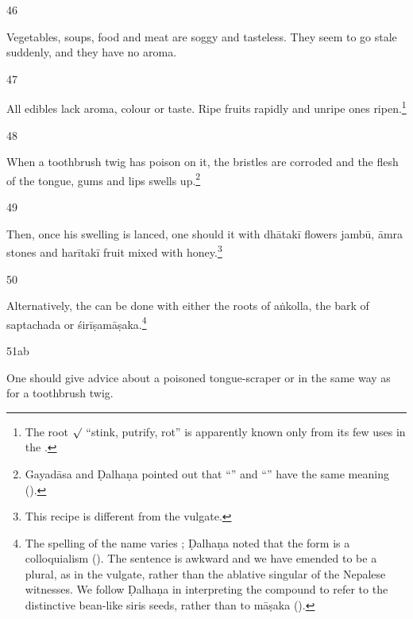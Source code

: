 \begin{translation}
\item[46]

Vegetables, soups, food and meat are soggy and tasteless.  They seem to go stale
suddenly, and they have no aroma.  

\item[47] 

All edibles lack aroma, colour or taste.  Ripe fruits rapidly  and 
unripe ones ripen.\footnote{The root $\surd$ “stink, 
    putrify, rot” 
    is apparently known only from its few uses in the \SS.}

\item[48]

When a toothbrush twig has poison on it, the bristles are corroded and the
flesh of the tongue, gums and lips swells up.\footnote{Gayadāsa and Ḍalhaṇa 
pointed out that “” and 
“” have the same meaning 
().}

\item[49]

 Then, once his swelling is 
 lanced, one should  it with
 \gls{dhātakī} flowers
 \gls{jambū},
 \gls{āmra} stones and
 \gls{harītakī}
 fruit mixed with honey.\footnote{This recipe is different from the vulgate.}
 
 \item[50] 
 
 
 Alternatively, the  can be done with either
 the roots of \gls{aṅkolla}, the bark
of \gls{saptachada} or \gls{śirīṣamāṣaka}.\footnote{The 
    spelling of
the name  varies  
\citep[5]{gvdb};
Ḍalhaṇa noted that the form   is a colloquialism
().  The sentence is awkward and we have emended
 to be a plural, as in the vulgate, rather than the ablative 
singular of 
the Nepalese witnesses.  We follow Ḍalhaṇa in interpreting the compound to refer 
to the distinctive bean-like siris seeds, rather than to \gls{māṣaka} 
().}

\item[51ab] 
 
One should give advice about a poisoned tongue-scraper or 
 in the
same way as  for a toothbrush twig.


\end{translation}
